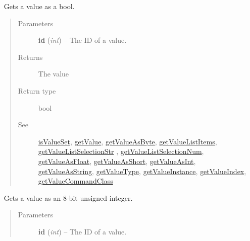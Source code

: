 \documentclass[letterpaper,10pt,english]{sphinxmanual}
\begin{document}
\begin{fulllineitems}
\begin{fulllineitems}
\begin{quote}
\begin{description}
\end{description}\end{quote}

\end{fulllineitems}


\begin{fulllineitems}
\label{libopenzwave:libopenzwave.PyManager.getValueAsBool}~\label{libopenzwave:getvalueasbool}
Gets a value as a bool.
\begin{quote}\begin{description}
\item[{Parameters}] \leavevmode
\textbf{id} (\emph{int}) -- The ID of a value.

\item[{Returns}] \leavevmode
The value

\item[{Return type}] \leavevmode
bool

\item[{See}] \leavevmode
{\hyperref[libopenzwave:isvalueset]{isValueSet}}, {\hyperref[libopenzwave:getvalue]{getValue}}, {\hyperref[libopenzwave:getvalueasbyte]{getValueAsByte}}, {\hyperref[libopenzwave:getvaluelistitems]{getValueListItems}}, {\hyperref[libopenzwave:getvaluelistselectionstr]{getValueListSelectionStr}} , {\hyperref[libopenzwave:getvaluelistselectionnum]{getValueListSelectionNum}}, {\hyperref[libopenzwave:getvalueasfloat]{getValueAsFloat}}, {\hyperref[libopenzwave:getvalueasshort]{getValueAsShort}}, {\hyperref[libopenzwave:getvalueasint]{getValueAsInt}}, {\hyperref[libopenzwave:getvalueasstring]{getValueAsString}}, {\hyperref[libopenzwave:getvaluetype]{getValueType}}, {\hyperref[libopenzwave:getvalueinstance]{getValueInstance}}, {\hyperref[libopenzwave:getvalueindex]{getValueIndex}}, {\hyperref[libopenzwave:getvaluecommandclass]{getValueCommandClass}}

\end{description}\end{quote}

\end{fulllineitems}


\begin{fulllineitems}
\label{libopenzwave:libopenzwave.PyManager.getValueAsByte}~\label{libopenzwave:getvalueasbyte}
Gets a value as an 8-bit unsigned integer.
\begin{quote}\begin{description}
\item[{Parameters}] \leavevmode
\textbf{id} (\emph{int}) -- The ID of a value.


\end{description}
\end{quote}
\end{fulllineitems}
\end{fulllineitems}
\end{document}

